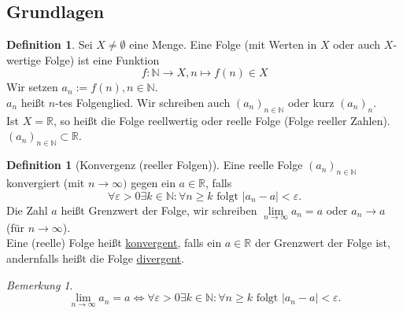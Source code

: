 \documentclass[12pt,a4paper,titlepage]{article} %
\theoremstyle{definition}
\newtheorem{defi}[satz]{Definition}
\theoremstyle{remark}
\newtheorem*{bem}{Bemerkung}
\newcommand{\N}{\mathbb{N}}
\newcommand{\R}{\mathbb{R}}
\newcommand{\limes}[1]{\lim\limits_{#1\rightarrow\infty}}
\begin{document}
\subsection{Grundlagen}
\begin{defi}
	Sei $X\neq\emptyset$ eine Menge. Eine Folge (mit Werten in $X$ oder auch $X$-wertige Folge) ist eine Funktion 
	$$f: \N \rightarrow X, n \mapsto f(n)\in X$$
	Wir setzen $a_n := f(n), n\in\N$.\\
	$a_n$ heißt $n$-tes Folgenglied. Wir schreiben auch $(a_n)_{n\in\N}$ oder kurz $(a_n)_n$.\\
	Ist $X = \R$, so heißt die Folge reellwertig oder reelle Folge (Folge reeller Zahlen). $(a_n)_{n\in\N} \subset \R$.
\end{defi}
\begin{defi}[Konvergenz (reeller Folgen)]
	Eine reelle Folge $(a_n)_{n\in\N}$ konvergiert (mit $n\rightarrow\infty)$ gegen ein $a\in\R$, falls 
	$$\forall \varepsilon > 0 \exists k \in \N: \forall n\geq k \text{ folgt } |a_n - a| < \varepsilon.$$
	Die Zahl $a$ heißt Grenzwert der Folge, wir schreiben $\limes{n}a_n = a$ oder $a_n\rightarrow a$ (für $n\rightarrow\infty$).\\
	Eine (reelle) Folge heißt \underline{konvergent}, falls ein $a\in\R$ der Grenzwert der Folge ist, andernfalls heißt die Folge \underline{divergent}.
\end{defi}
\begin{bem}
	$$\limes{n}a_n = a \Leftrightarrow \forall \varepsilon > 0 \exists k\in\N: \forall n\geq k \text{ folgt } |a_n -a|< \varepsilon.$$
\end{bem}
\end{document}
